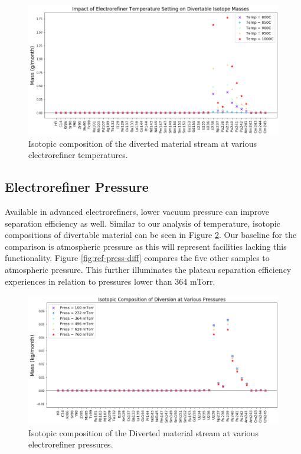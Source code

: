 \begin{figure}
	\includegraphics[width=\linewidth]{images/temperature-sa-diff}
	\caption{Isotopic composition of the diverted material stream at various electrorefiner temperatures.}
	\label{fig:ref-temp-diff}
\end{figure}

\subsection{Electrorefiner Pressure}

Available in advanced electrorefiners, lower vacuum pressure can improve separation efficiency as well. Similar to our analysis of temperature, isotopic compositions of
divertable material can be seen in Figure \ref{fig:ref-press-sa}. Our baseline for the comparison is atmospheric pressure as this will represent facilities lacking this
functionality. Figure \ref{fig:ref-press-diff} compares the five other samples to atmospheric pressure. This further illuminates the plateau separation efficiency experiences in relation to pressures lower than 364 mTorr.

\begin{figure}
	\includegraphics[width=\linewidth]{images/pressure-sa-comp}
	\caption{Isotopic composition of the Diverted material stream at various electrorefiner pressures.}
	\label{fig:ref-press-sa}
\end{figure}

